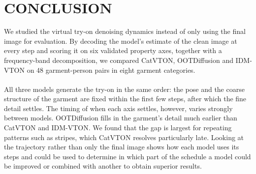 \section{\uppercase{Conclusion}}
\label{sec:conclusion}

We studied the virtual try-on denoising dynamics instead of only using the final image for evaluation. By decoding the model's estimate of the clean image at every step and scoring it on six validated property axes, together with a frequency-band decomposition, we compared CatVTON, OOTDiffusion and IDM-VTON on 48 garment-person pairs in eight garment categories.
\\ \\
All three models generate the try-on in the same order: the pose and the coarse structure of the garment are fixed within the first few steps, after which the fine detail settles. The timing of when each axis settles, however, varies strongly between models. OOTDiffusion fills in the garment's detail much earlier than CatVTON and IDM-VTON. We found that the gap is largest for repeating patterns such as stripes, which CatVTON resolves particularly late. Looking at the trajectory rather than only the final image shows how each model uses its steps and could be used to determine in which part of the schedule a model could be improved or combined with another to obtain superior results.
